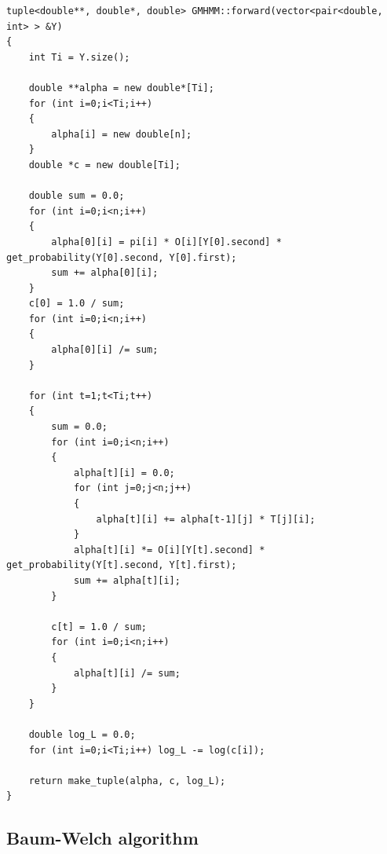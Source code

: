 \documentclass[12pt,a4paper,twoside,openright]{report}
\begin{document}
\begin{lstlisting}[numbersep=10pt]
tuple<double**, double*, double> GMHMM::forward(vector<pair<double, int> > &Y)
{
	int Ti = Y.size();
    
	double **alpha = new double*[Ti];
	for (int i=0;i<Ti;i++)
	{
		alpha[i] = new double[n];
	}
	double *c = new double[Ti];
    
	double sum = 0.0;
	for (int i=0;i<n;i++)
	{
		alpha[0][i] = pi[i] * O[i][Y[0].second] * get_probability(Y[0].second, Y[0].first);
		sum += alpha[0][i];
	}
	c[0] = 1.0 / sum;
	for (int i=0;i<n;i++)
	{
		alpha[0][i] /= sum;
	}
    
	for (int t=1;t<Ti;t++)
	{
		sum = 0.0;
		for (int i=0;i<n;i++)
		{
			alpha[t][i] = 0.0;
			for (int j=0;j<n;j++)
			{
				alpha[t][i] += alpha[t-1][j] * T[j][i];
			}
			alpha[t][i] *= O[i][Y[t].second] * get_probability(Y[t].second, Y[t].first);
			sum += alpha[t][i];
		}
        
		c[t] = 1.0 / sum;
		for (int i=0;i<n;i++)
		{
			alpha[t][i] /= sum;
		}
	}
    
	double log_L = 0.0;
	for (int i=0;i<Ti;i++) log_L -= log(c[i]);
    
	return make_tuple(alpha, c, log_L);
}
\end{lstlisting}

\subsection{Baum-Welch algorithm}
\end{document}
